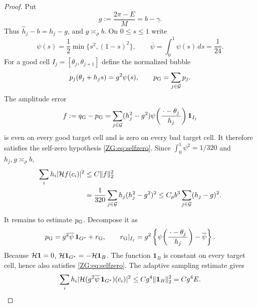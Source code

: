 \begin{proof}
Put
\[
 g:=\frac{2\pi-E}{M}=b-\gamma.
\]
Thus $\widehat h_j-b=h_j-g$, and $g\asymp_\rho b$.  On $0\le s\le1$
write
\[
 \psi(s)=\frac12\min\{s^2,(1-s)^2\},
 \qquad \overline\psi=\int_0^1\psi(s)\,ds=\frac1{24}.
\]
For a good cell $I_j=[\theta_j,\theta_{j+1}]$ define the normalized
bubble
\[
 p_j(\theta_j+h_js)=g^2\psi(s),
 \qquad p_{\rm G}=\sum_{j\in\mathcal G}p_j.
\]
The amplitude error
\[
 f:=q_{\rm G}-p_{\rm G}
 =\sum_{j\in\mathcal G}(h_j^2-g^2)
   \psi\!\left(\frac{\,\cdot-\theta_j\,}{h_j}\right)\mathbf1_{I_j}
\]
is even on every good target cell and is zero on every bad target cell.
It therefore satisfies the self-zero hypothesis \eqref{ZG:eq:selfzero}.
Since $\int_0^1\psi^2=1/320$ and $h_j,g\asymp_\rho b$,
\begin{align}
 \sum_i h_i|\mathcal H f(c_i)|^2
 &\le C\|f\|_2^2\notag\\
 &=\frac1{320}\sum_{j\in\mathcal G}
 h_j(h_j^2-g^2)^2
 \le C_\rho b^3\sum_{j\in\mathcal G}(h_j-g)^2.
 \label{ZG:eq:amplitude-error}
\end{align}

It remains to estimate $p_{\rm G}$.  Decompose it as
\begin{equation}\label{ZG:eq:normalized-decomposition}
 p_{\rm G}=g^2\overline\psi\,\mathbf1_{G^*}+r_{\rm G},
 \qquad
 r_{\rm G}|_{I_j}
 =g^2\left\{\psi\!\left(\frac{\,\cdot-\theta_j\,}{h_j}\right)
             -\overline\psi\right\}.
\end{equation}
Because $\mathcal H\mathbf1=0$,
$\mathcal H\mathbf1_{G^*}=-\mathcal H\mathbf1_B$.  The function $\mathbf1_B$ is
constant on every target cell, hence also satisfies
\eqref{ZG:eq:selfzero}.  The adaptive sampling estimate gives
\begin{equation}\label{ZG:eq:mean-gap}
 \sum_i h_i|\mathcal H(g^2\overline\psi\,\mathbf1_{G^*})(c_i)|^2
 \le Cg^4\|\mathbf1_B\|_2^2
 =Cg^4E.
\end{equation}


\end{proof}
